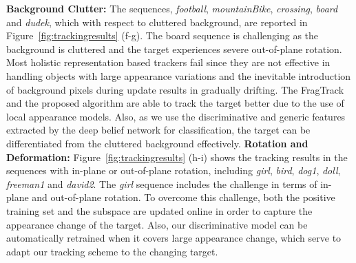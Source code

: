 \documentclass[preprint,12pt,review]{elsarticle}
\begin{document}
{\flushleft \bf{Background Clutter:}}
The sequences, \emph{football}, \emph{mountainBike}, \emph{crossing}, \emph{board} and \emph{dudek}, which with respect to cluttered background, are reported in Figure~\ref{fig:trackingresults} (f-g).
The board sequence is challenging as the background is cluttered and the target experiences severe out-of-plane rotation.
Most holistic representation based trackers fail since they are not effective in handling objects with large appearance variations and the inevitable introduction of background pixels during update results in gradually drifting.
The FragTrack and the proposed algorithm are able to track the target better due to the use of local appearance models.
Also, as we use the discriminative and generic features extracted by the deep belief network for classification, the target can be differentiated from the cluttered background effectively.
{\flushleft \bf{Rotation and Deformation:}}
Figure~\ref{fig:trackingresults} (h-i) shows the tracking results in the sequences with in-plane or out-of-plane rotation, including \emph{girl}, \emph{bird}, \emph{dog1}, \emph{doll}, \emph{freeman1} and \emph{david2}.
The \emph{girl} sequence includes the challenge in terms of in-plane and out-of-plane rotation.
To overcome this challenge, both the positive training set and the subspace are updated online in order to capture the appearance change of the target.
Also, our discriminative model can be automatically retrained when it covers large appearance change, which serve to adapt our tracking scheme to the changing target.
\end{document}
